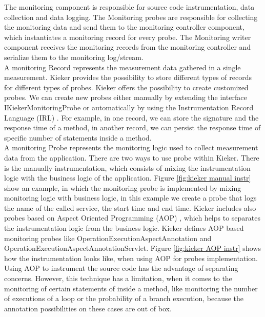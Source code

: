 The monitoring component is responsible for source code instrumentation, data collection and data logging. The Monitoring probes are responsible for collecting the monitoring data and send them to the monitoring controller component, which instantiates a monitoring record for every probe. The Monitoring writer component receives the monitoring records from the monitoring controller and serialize them to the monitoring log/stream. \\

A monitoring Record represents the measurement data gathered in a single measurement. Kieker provides the possibility to store different types of records for different types of probes. Kieker offers the possibility to create customized probes. We can create new probes either manually by extending the interface IKiekerMonitoringProbe or automatically by using the Instrumentation Record Language (IRL) \cite{jung2013instrumentation}. For example, in one record, we can store the signature and the response time of a method, in another record, we can persist the response time of specific number of statements inside a method.\\

A monitoring Probe represents the monitoring logic used to collect measurement data from the application. There are two ways to use probe within Kieker.  There is the manually instrumentation, which consists of mixing the instrumentation logic with the business logic of the application. Figure \ref{fig:kieker manual instr} show an example, in which the monitoring probe is implemented by mixing monitoring logic with business logic, in this example we create a probe that logs the name of the called service, the start time and end time. Kieker includes also probes based on Aspect Oriented Programming (AOP) \cite{kiczales1997j}, which helps to separates the instrumentation logic from the business logic. Kieker defines AOP based monitoring probes like OperationExecutionAspectAnnotation and OperationExecutionAspectAnnotationServlet. Figure \ref{fig:kieker AOP instr} shows how the instrumentation looks like, when using AOP for probes implementation.\\

Using AOP to instrument the source code has the advantage of separating concerns. However, this technique has a limitation, when it comes to the monitoring of certain statements of inside a method, like monitoring the number of executions of a loop or the probability of a branch execution, because the annotation possibilities on these cases are out of box.\\ 


